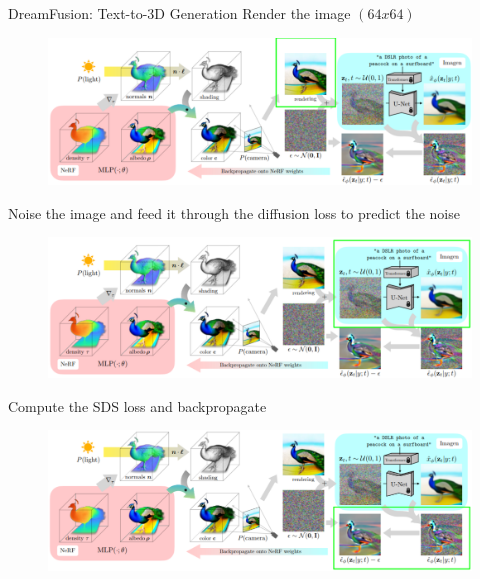 \begin{frame}[allowframebreaks]{DreamFusion: Text-to-3D Generation}
    \framebreak
    \large Render the image $(64 x 64)$
    \begin{figure}
        \centering
        \includegraphics[width=1.05\linewidth,height=\textheight,keepaspectratio]{images/adv-img-gen/slide_154_1_img.png}
    \end{figure}

    \framebreak
    \large Noise the image and feed it through the diffusion loss to predict the noise
    \begin{figure}
        \centering
        \includegraphics[width=1.05\linewidth,height=\textheight,keepaspectratio]{images/adv-img-gen/slide_155_1_img.png}
    \end{figure}

    \framebreak
    \large Compute the SDS loss and backpropagate
    \begin{figure}
        \centering
        \includegraphics[width=1.05\linewidth,height=\textheight,keepaspectratio]{images/adv-img-gen/slide_156_1_img.png}
    \end{figure}

    \framebreak


\end{frame}

